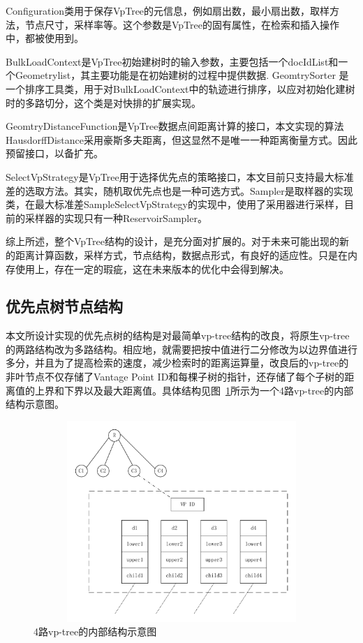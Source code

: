 Configuration类用于保存VpTree的元信息，例如扇出数，最小扇出数，取样方法，节点尺寸，采样率等。这个参数是VpTree的固有属性，在检索和插入操作中，都被使用到。

BulkLoadContext是VpTree初始建树时的输入参数，主要包括一个docIdList和一个Geometrylist，其主要功能是在初始建树的过程中提供数据.
GeomtrySorter 是一个排序工具类，用于对BulkLoadContext中的轨迹进行排序，以应对初始化建树时的多路切分，这个类是对快排的扩展实现。

GeomtryDistanceFunction是VpTree数据点间距离计算的接口，本文实现的算法HausdorffDistance采用豪斯多夫距离，但这显然不是唯一一种距离衡量方式。因此预留接口，以备扩充。

SelectVpStrategy是VpTree用于选择优先点的策略接口，本文目前只支持最大标准差的选取方法。其实，随机取优先点也是一种可选方式。Sampler是取样器的实现类，在最大标准差SampleSelectVpStrategy的实现中，使用了采用器进行采样，目前的采样器的实现只有一种ReservoirSampler。

综上所述，整个VpTree结构的设计，是充分面对扩展的。对于未来可能出现的新的距离计算函数，采样方式，节点结构，数据点形式，有良好的适应性。只是在内存使用上，存在一定的瑕疵，这在未来版本的优化中会得到解决。


\subsection{优先点树节点结构}
本文所设计实现的优先点树的结构是对最简单vp-tree结构的改良，将原生vp-tree的两路结构改为多路结构。相应地，就需要把按中值进行二分修改为以边界值进行多分，并且为了提高检索的速度，减少检索时的距离运算量，改良后的vp-tree的非叶节点不仅存储了Vantage Point ID和每棵子树的指针，还存储了每个子树的距离值的上界和下界以及最大距离值。具体结构见图~\ref{vp-tree-structure1}所示为一个4路vp-tree的内部结构示意图。
\begin{figure}[H]
  \centering
  \includegraphics[width=5in,height=3in]{new_FIGs/chapter4/vp-tree-structure1.pdf}
  \caption{4路vp-tree的内部结构示意图}\label{vp-tree-structure1}
\end{figure}
